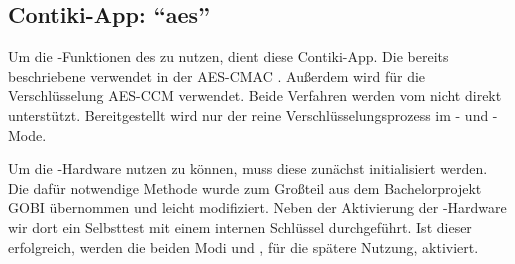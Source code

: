 \subsection{Contiki-App: "`aes"'}

Um die -Funktionen des  \cite{mc1322} zu nutzen, dient diese Contiki-App. Die bereits beschriebene 
verwendet in der  AES-CMAC \cite{rfc4493}. Außerdem wird für die Verschlüsselung AES-CCM \cite{rfc3610} verwendet. Beide Verfahren
werden vom  nicht direkt unterstützt. Bereitgestellt wird nur der reine  Verschlüsselungsprozess im - und -Mode.

Um die -Hardware nutzen zu können, muss diese zunächst initialisiert werden. Die dafür notwendige Methode wurde zum Großteil aus dem Bachelorprojekt GOBI
übernommen und leicht modifiziert. Neben der Aktivierung der -Hardware wir dort ein Selbsttest mit einem internen Schlüssel durchgeführt. Ist dieser
erfolgreich, werden die beiden Modi  und , für die spätere Nutzung, aktiviert.


